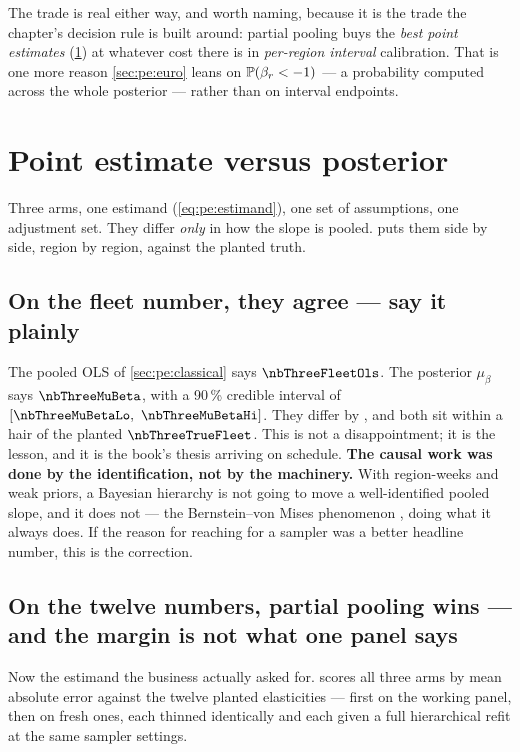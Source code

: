 The trade is real either way, and worth naming, because it is the trade the chapter's decision rule
is built around: partial pooling buys the \emph{best point estimates} (\cref{sec:pe:compare}) at
whatever cost there is in \emph{per-region interval} calibration. That is one more reason
\cref{sec:pe:euro} leans on $\operatorname{\mathbb{P}}(\beta_r < -1)$ --- a probability computed across the whole
posterior --- rather than on interval endpoints.

\section{Point estimate versus posterior}
\label{sec:pe:compare}

Three arms, one estimand (\cref{eq:pe:estimand}), one set of assumptions, one adjustment set. They
differ \emph{only} in how the slope is pooled.  puts them side by side, region
by region, against the planted truth.



\subsection*{On the fleet number, they agree --- say it plainly}

The pooled OLS of \cref{sec:pe:classical} says $\nbThreeFleetOls$. The posterior $\mu_\beta$ says
$\nbThreeMuBeta$, with a 90\,\% credible interval of
$[\nbThreeMuBetaLo,\ \nbThreeMuBetaHi]$. They differ by \nbThreeMuVsOls, and both sit within a hair
of the planted $\nbThreeTrueFleet$. This is not a disappointment; it is the lesson, and it is the
book's thesis arriving on schedule. \textbf{The causal work was done by the identification, not by
the machinery.} With \nbThreeNObs{} region-weeks and weak priors, a Bayesian hierarchy is not going
to move a well-identified pooled slope, and it does not --- the Bernstein--von Mises phenomenon
\citep{gelman2013, vandervaart1998}, doing what it always does. If the reason for reaching for a
sampler was a better headline number, this is the correction.

\subsection*{On the twelve numbers, partial pooling wins --- and the margin is not what one panel says}

Now the estimand the business actually asked for.  scores all three arms by
mean absolute error against the twelve planted elasticities --- first on the working panel, then on
\nbThreeNseed{} fresh ones, each thinned identically and each given a full hierarchical refit at
the same sampler settings.

